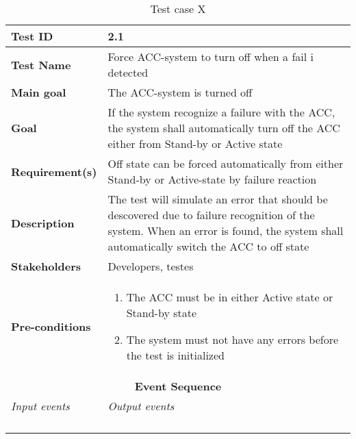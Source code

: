 \begin{table}[H]
\centering
\begin{tabularx}{\linewidth}{X|X}
  \hline
  \textbf{Test ID} & 2.1\\
  \hline
  \textbf{Test Name} &  Force ACC-system to turn off when a fail i detected\\
  \hline
  \textbf{Main goal} &  The ACC-system is turned off\\
  \hline
  \textbf{Goal} & If the system recognize a failure with the ACC, the system shall automatically turn off the ACC either from Stand-by or Active state \\
  \hline
  \textbf{Requirement(s)} &  Off state can be forced automatically from either Stand-by or Active-state by failure reaction\\
  \hline
  \textbf{Description} &  The test will simulate an error that should be descovered due to failure recognition of the system. When an error is found, the system shall automatically switch the ACC to off state\\
  \hline
  \textbf{Stakeholders} & Developers, testes \\
  \hline
  \textbf{Pre-conditions} & 
  \begin{enumerate}
      \item The ACC must be in either Active state or Stand-by state
      \item The system must not have any errors before the test is initialized
  \end{enumerate}\\
  \hline
  \multicolumn{2}{c}{\textbf{Event Sequence}} \\
  \hline
  \textit{Input events} & \textit{Output events} \\
  \hline
   &  \\
  \hline
   &  \\
  \hline
   &  \\
  \hline
   &  \\
  \hline
  \end{tabularx}
\caption{\label{tab_caseX} Test case X}
\end{table}


